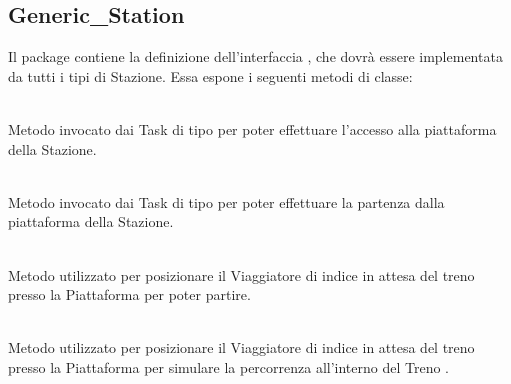 	\subsection{Generic\_Station}
	
	Il package  contiene la definizione dell'interfaccia , che dovrà essere implementata da tutti i tipi di Stazione. Essa espone i seguenti metodi di classe:
	\begin{description}
		\item {} \\
		Metodo invocato dai Task di tipo  per poter effettuare l'accesso alla piattaforma  della Stazione.
		
		\item {} \\
		Metodo invocato dai Task di tipo  per poter effettuare la partenza dalla piattaforma  della Stazione.
		
		\item {} \\
		Metodo utilizzato per posizionare il Viaggiatore di indice  in attesa del treno  presso la Piattaforma  per poter partire.		
			
		\item {} \\
		Metodo utilizzato per posizionare il Viaggiatore di indice  in attesa del treno  presso la Piattaforma  per simulare la percorrenza all'interno del Treno .
			

\end{description}
